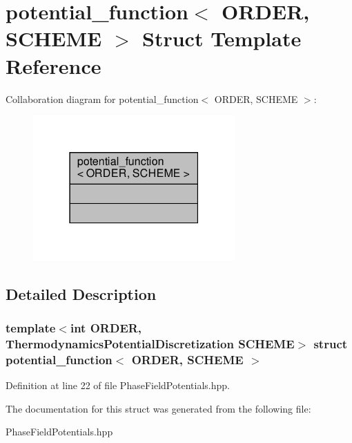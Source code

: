 \hypertarget{structpotential__function}{}\section{potential\+\_\+function$<$ O\+R\+D\+ER, S\+C\+H\+E\+ME $>$ Struct Template Reference}
\label{structpotential__function}


Collaboration diagram for potential\+\_\+function$<$ O\+R\+D\+ER, S\+C\+H\+E\+ME $>$\+:\nopagebreak
\begin{figure}[H]
\begin{center}
\leavevmode
\includegraphics[width=219pt]{structpotential__function__coll__graph}
\end{center}
\end{figure}


\subsection{Detailed Description}
\subsubsection*{template$<$int O\+R\+D\+ER, Thermodynamics\+Potential\+Discretization S\+C\+H\+E\+ME$>$\newline
struct potential\+\_\+function$<$ O\+R\+D\+E\+R, S\+C\+H\+E\+M\+E $>$}



Definition at line 22 of file Phase\+Field\+Potentials.\+hpp.



The documentation for this struct was generated from the following file\+:\begin{DoxyCompactItemize}
\item 
Phase\+Field\+Potentials.\+hpp\end{DoxyCompactItemize}
